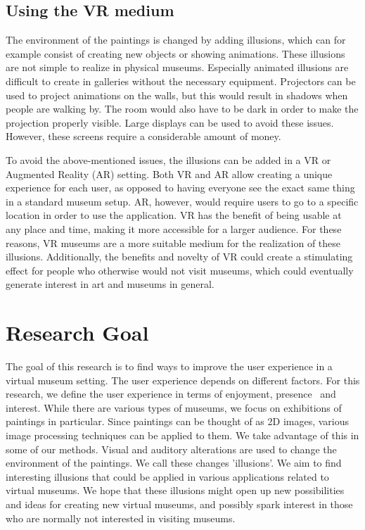 \documentclass[a4paper]{article}
\begin{document}
\subsection{Using the VR medium} %
The environment of the paintings is changed by adding illusions, which can for example consist of creating new objects or showing animations. These illusions are not simple to realize in physical museums. Especially animated illusions are difficult to create in galleries without the necessary equipment. Projectors can be used to project animations on the walls, but this would result in shadows when people are walking by. The room would also have to be dark in order to make the projection properly visible. Large displays can be used to avoid these issues. However, these screens require a considerable amount of money.

To avoid the above-mentioned issues, the illusions can be added in a VR or Augmented Reality (AR) setting. Both VR and AR allow creating a unique experience for each user, as opposed to having everyone see the exact same thing in a standard museum setup. AR, however, would require users to go to a specific location in order to use the application. VR has the benefit of being usable at any place and time, making it more accessible for a larger audience. For these reasons, VR museums are a more suitable medium for the realization of these illusions. Additionally, the benefits and novelty of VR could create a stimulating effect for people who otherwise would not visit museums, which could eventually generate interest in art and museums in general.



\section{Research Goal}

The goal of this research is to find ways to improve the user experience in a virtual museum setting. The user experience depends on different factors. For this research, we define the user experience in terms of enjoyment, presence~\cite{witmer} and interest. While there are various types of museums, we focus on exhibitions of paintings in particular. Since paintings can be thought of as 2D images, various image processing techniques can be applied to them. We take advantage of this in some of our methods. Visual and auditory alterations are used to change the environment of the paintings. We call these changes 'illusions'. We aim to find interesting illusions that could be applied in various applications related to virtual museums. We hope that these illusions might open up new possibilities and ideas for creating new virtual museums, and possibly spark interest in those who are normally not interested in visiting museums. 
\end{document}
